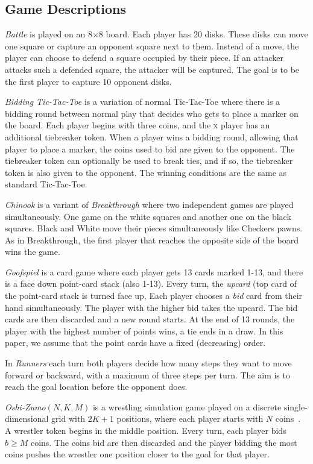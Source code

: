 \documentclass[conference]{IEEEtran}
\begin{document}
\subsection{Game Descriptions}
\label{subsec:games}

\textit{Battle} is played on an 8$\times$8 board. Each player has 20 disks. These disks can move one square or 
capture an opponent square next to them. Instead of a move, the player can choose to defend a square occupied by their 
piece. If an attacker attacks such a defended square, the attacker will be captured. The goal is to be the first player 
to capture 10 opponent disks. 

\textit{Bidding Tic-Tac-Toe} is a variation of normal Tic-Tac-Toe where there is a bidding round between 
normal play that decides who gets to place a marker on the board. Each player begins with three coins, and the 
\textsc{x} player has an additional tiebreaker token. When a player wins a bidding round, allowing that player to 
place a marker, the coins used to bid are given to the opponent. The tiebreaker token can optionally be used to break 
ties, and if so, the tiebreaker token is also given to the opponent. The winning conditions are the same as 
standard Tic-Tac-Toe. 

\textit{Chinook} is a variant of \textit{Breakthrough} where two independent games are played simultaneously. 
One game on the white squares and another one on the black squares. Black and White move their pieces simultaneously 
like Checkers pawns. As in Breakthrough, the first player that reaches the opposite side of the board wins the game. 

\textit{Goofspiel} is a card game where each player gets 13 cards marked 1-13, and there is a face down 
point-card stack (also 1-13). Every turn, the {\it upcard} (top card of the point-card stack is turned face up, 
Each player chooses a {\it bid} card from their hand simultaneously. 
The player with the higher bid takes the upcard. The bid cards are then discarded and a new round starts. 
At the end of 13 rounds, the player with the highest number of points wins, a tie ends in a draw.
In this paper, we assume that the point cards have a fixed (decreasing) order. 

In \textit{Runners} each turn both players decide how many steps they want to move forward or backward, with a maximum of three steps per turn. The aim is to reach the goal location before the opponent does.

\textit{Oshi-Zumo}$(N,K,M)$ is a wrestling simulation game played on a discrete single-dimensional grid with 
$2K+1$ positions, where each player starts with $N$ coins~\cite{Buro03OshiZumo}. A wrestler token begins in the middle 
position. Every turn, 
each player bids $b \ge M$ coins. The coins bid are then discarded and the player bidding the most coins pushes the 
wrestler one position closer to the goal for that player. 
\end{document}
